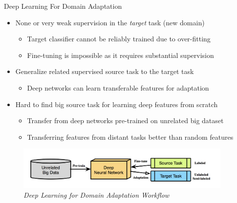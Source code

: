 \documentclass{beamer}
\begin{document}
\begin{frame}[fragile]{Deep Learning For Domain Adaptation}
\begin{itemize}
\item{None or very weak supervision in the \emph{target} task (new domain)}
  \begin{itemize}
  \item{Target classifier cannot be reliably trained due to over-fitting}
  \item{Fine-tuning is impossible as it requires substantial supervision}
  \end{itemize}
\item{Generalize related supervised source task to the target task}
  \begin{itemize}
  \item{Deep networks can learn transferable features for adaptation}
  \end{itemize}
\item{Hard to find big source task for learning deep features from scratch}
  \begin{itemize}
  \item{Transfer from deep networks pre-trained on unrelated big dataset}
  \item{Transferring features from distant tasks better than random features}
  \end{itemize}
\end{itemize}
\begin{figure}[h]
    \centering
    \includegraphics[width=0.95\textwidth]{fig1}
    \caption{\emph{Deep Learning for Domain Adaptation Workflow}}
    \label{fig:mesh2}
\end{figure}
\end{frame}
\end{document}
